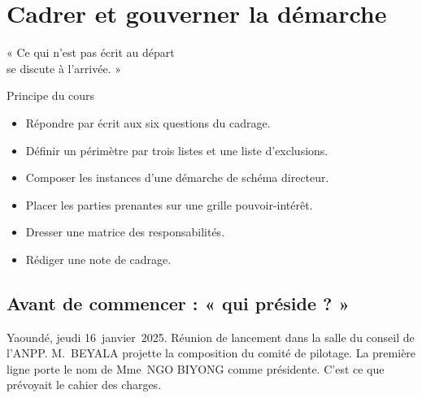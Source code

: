 
\chapter{Cadrer et gouverner la démarche}
\label{chap:cadrer}

\epigraph{%
    « Ce qui n'est pas écrit au départ\\
    se discute à l'arrivée. »%
}{Principe du cours}


\begin{boxobjectifs}
\begin{itemize}
    \item Répondre par écrit aux six questions du cadrage.
    \item Définir un périmètre par trois listes et une liste d'exclusions.
    \item Composer les instances d'une démarche de schéma directeur.
    \item Placer les parties prenantes sur une grille pouvoir-intérêt.
    \item Dresser une matrice des responsabilités.
    \item Rédiger une note de cadrage.
\end{itemize}
\end{boxobjectifs}

\bigskip

\section*{Avant de commencer : « qui préside ? »}

Yaoundé, jeudi 16~janvier~2025. Réunion de lancement dans la salle du conseil de l'ANPP. M.~BEYALA projette la
composition du comité de pilotage. La première ligne porte le nom de Mme~NGO BIYONG comme présidente. C'est ce
que prévoyait le cahier des charges.

